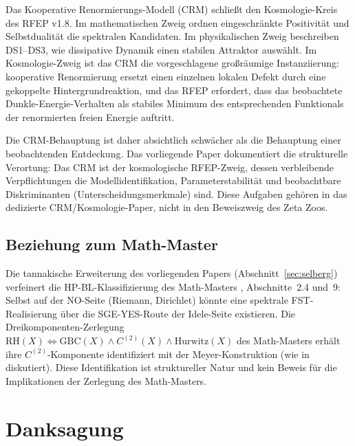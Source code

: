 \documentclass[11pt,a4paper]{article}
\theoremstyle{plain}
\theoremstyle{definition}
\begin{document}
Das Kooperative Renormierungs-Modell (CRM) schließt den Kosmologie-Kreis
des RFEP v1.8. Im mathematischen Zweig ordnen eingeschränkte Positivität
und Selbstdualität die spektralen Kandidaten. Im physikalischen Zweig
beschreiben DS1--DS3, wie dissipative Dynamik einen stabilen Attraktor auswählt.
Im Kosmologie-Zweig ist das CRM die vorgeschlagene großräumige
Instanziierung: kooperative Renormierung ersetzt einen einzelnen lokalen Defekt
durch eine gekoppelte Hintergrundreaktion, und das RFEP erfordert, dass das
beobachtete Dunkle-Energie-Verhalten als stabiles Minimum des entsprechenden
Funktionals der renormierten freien Energie auftritt.

Die CRM-Behauptung ist daher absichtlich schwächer als die Behauptung
einer beobachtenden Entdeckung. Das vorliegende Paper dokumentiert
die strukturelle Verortung: Das CRM ist der kosmologische RFEP-Zweig,
dessen verbleibende Verpflichtungen die Modellidentifikation, Parameterstabilität
und beobachtbare Diskriminanten (Unterscheidungsmerkmale) sind. Diese Aufgaben
gehören in das dedizierte CRM/Kosmologie-Paper, nicht in den Beweiszweig des Zeta Zoos.

\subsection{Beziehung zum Math-Master}

Die tannakische Erweiterung des vorliegenden Papers (Abschnitt~\ref{sec:selberg})
verfeinert die HP-BL-Klassifizierung des Math-Masters \cite{MathMaster},
Abschnitte~2.4 und~9: Selbst auf der NO-Seite (Riemann, Dirichlet) könnte eine spektrale
FST-Realisierung über die SGE-YES-Route der Idele-Seite existieren. Die
Dreikomponenten-Zerlegung $\mathrm{RH}(X) \iff \mathrm{GBC}(X) \wedge C^{(2)}(X) \wedge \mathrm{Hurwitz}(X)$
des Math-Masters erhält ihre $C^{(2)}$-Komponente identifiziert mit der
Meyer-Konstruktion (wie in \cite{C2LayerStatus} diskutiert). Diese Identifikation ist
struktureller Natur und kein Beweis für die Implikationen der Zerlegung des Math-Masters.

\section*{Danksagung}
\end{document}
